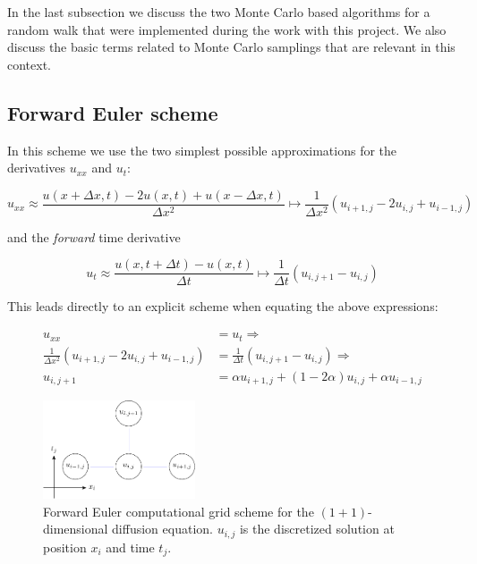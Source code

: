 \documentclass[a4paper, 11pt, notitlepage,english]{article}
\begin{document}
In the last subsection we discuss the two Monte Carlo based algorithms for a random walk that were implemented during the work with this project. We also discuss the basic terms related to Monte Carlo samplings that are relevant in this context.

\subsection{Forward Euler scheme}
In this scheme we use the two simplest possible approximations for the derivatives $u_{xx}$ and $u_t$:

\begin{equation}
u_{xx} \approx \frac{u(x+\Delta x,t)-2u(x,t)+u(x-\Delta x, t)}{\Delta x^2} \mapsto \frac{1}{\Delta x^2} (u_{i+1,j}-2u_{i,j}+u_{i-1,j})
\label{eq:Forward_uxx}
\end{equation}

and the \emph{forward} time derivative

\begin{equation}
u_{t} \approx \frac{u(x,t+\Delta t)-u(x, t)}{\Delta t} \mapsto \frac{1}{\Delta t} (u_{i,j+1}-u_{i,j})
\label{eq:Forward_ut}
\end{equation}

This leads directly to an explicit scheme when equating the above expressions:

\begin{align}
u_{xx} &= u_t \Rightarrow \\
 \frac{1}{\Delta x^2} (u_{i+1,j}-2u_{i,j}+u_{i-1,j}) &= \frac{1}{\Delta t} (u_{i,j+1}-u_{i,j}) \Rightarrow \\
 u_{i,j+1} &= \alpha u_{i+1,j} + (1-2\alpha)u_{i,j} + \alpha u_{i-1,j}
\label{eq:Forward_Euler_scheme}
\end{align}

\begin{figure}[h!tb]
 \centering
 \includegraphics[width=0.4\textwidth]{Grid_FE-figure0}
 \caption{Forward Euler computational grid scheme for the $(1+1)$-dimensional diffusion equation. $u_{i,j}$ is the discretized solution at position $x_i$ and time $t_j$.}
 \label{fig:FE_grid}
\end{figure}
\end{document}
